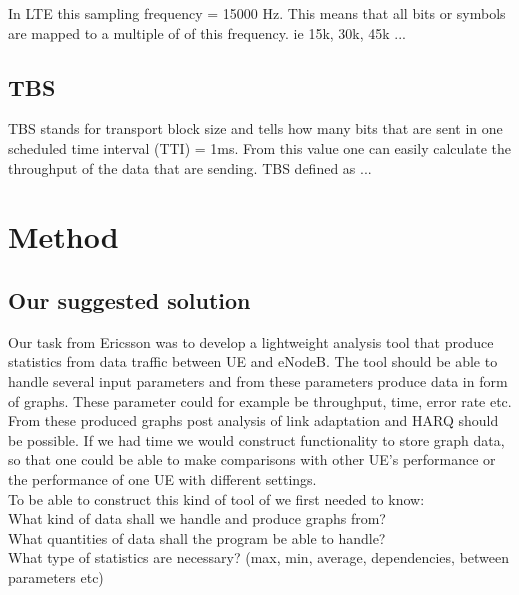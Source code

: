 \documentclass[cropmarks, frame, english]{idamasterthesis}
\begin{document}
In LTE this sampling frequency = 15000 Hz. This means that all bits or symbols are mapped to a multiple of of this frequency. ie 15k, 30k, 45k ... 

\section{TBS}
TBS stands for transport block size and tells how many bits that are sent in one scheduled time interval  (TTI) = 1ms. From this value one can easily calculate the throughput of the data that are sending. TBS defined as ...
















\chapter{Method} %

\section{Our suggested solution}

Our task from Ericsson was to develop a lightweight analysis tool that produce statistics from data traffic between UE and eNodeB. The tool should be able to handle several input parameters and from these parameters produce data in form of graphs. These parameter could for example be throughput, time, error rate etc. \\
From these produced graphs post analysis of link adaptation and HARQ should be possible.
If we had time we would construct functionality to store graph data, so that one could be able to make comparisons with other UE's performance or the performance of one UE with different settings. \\

\setlength{\parindent}{0cm} To be able to construct this kind of tool of we first needed to know:\\
What kind of data shall we handle and produce graphs from? \\
What quantities of data shall the program be able to handle? \\
What type of statistics are necessary? (max, min, average, dependencies, between parameters etc)
\end{document}
